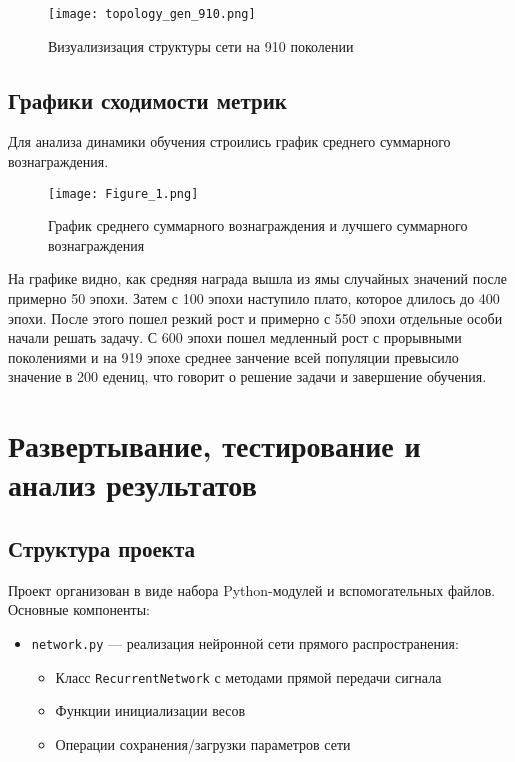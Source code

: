 \documentclass[a4paper,12pt]{article}
\begin{document}
\begin{itemize}
\begin{figure}[H]
	\centering
	\texttt{[image: topology\_gen\_910.png]}
	\caption{Визуализизация структуры сети на 910 поколении}
	\label{fig:test_results}
\end{figure}


\subsection{Графики сходимости метрик}

Для анализа динамики обучения строились график среднего суммарного вознаграждения.






\begin{figure}[H]
	\centering
	\texttt{[image: Figure\_1.png]}
	\caption{График среднего суммарного вознаграждения и лучшего суммарного вознаграждения}
	\label{fig:test_results}
\end{figure}

На графике видно, как средняя награда вышла из ямы случайных значений после примерно 50 эпохи. Затем с 100 эпохи наступило плато, которое длилось до 400 эпохи. После этого пошел резкий рост и примерно с 550 эпохи отдельные особи начали решать задачу. С 600 эпохи пошел медленный рост с прорывными поколениями и на 919 эпохе среднее занчение всей популяции превысило значение в 200 едениц, что говорит о решение задачи и завершение обучения.


\section{Развертывание, тестирование и анализ результатов}



\subsection{Структура проекта}

Проект организован в виде набора Python-модулей и вспомогательных файлов. Основные компоненты:


\begin{itemize}
	\item \texttt{network.py} --- реализация нейронной сети прямого распространения:
	\begin{itemize}
		\item Класс \texttt{RecurrentNetwork} с методами прямой передачи сигнала
		\item Функции инициализации весов
		\item Операции сохранения/загрузки параметров сети
	\end{itemize}
	

\end{itemize}
\end{itemize}
\end{document}
